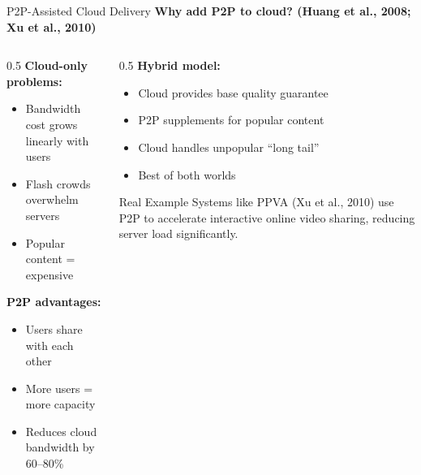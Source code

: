 \documentclass[aspectratio=169,12pt]{beamer}
\begin{document}
\begin{frame}{P2P-Assisted Cloud Delivery}
    \textbf{Why add P2P to cloud? (Huang et al., 2008; Xu et al., 2010)}
    
    \vspace{0.3cm}
    \begin{columns}
        \begin{column}{0.5\textwidth}
            \textbf{Cloud-only problems:}
            \begin{itemize}
                \item Bandwidth cost grows linearly with users
                \item Flash crowds overwhelm servers
                \item Popular content = expensive
            \end{itemize}
            
            \vspace{0.3cm}
            \textbf{P2P advantages:}
            \begin{itemize}
                \item Users share with each other
                \item More users = more capacity
                \item Reduces cloud bandwidth by 60--80\%
            \end{itemize}
        \end{column}
        \begin{column}{0.5\textwidth}
            \textbf{Hybrid model:}
            \begin{itemize}
                \item Cloud provides base quality guarantee
                \item P2P supplements for popular content
                \item Cloud handles unpopular ``long tail''
                \item Best of both worlds
            \end{itemize}
            
            \vspace{0.3cm}
            \begin{alertblock}{Real Example}
                Systems like PPVA (Xu et al., 2010) use P2P to accelerate interactive online video sharing, reducing server load significantly.
            \end{alertblock}
        \end{column}
    \end{columns}
\end{frame}
\end{document}
